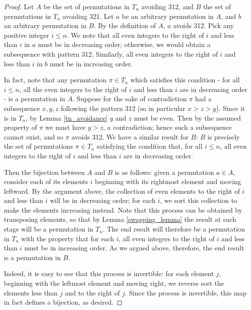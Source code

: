 \documentclass[11pt,letterpaper,twoside,english]{article}
\theoremstyle{theorem}
\theoremstyle{remark}
\begin{document}
\begin{proof}
Let $A$ be the set of permutations in $T_n$ avoiding 312, and $B$ the set of permutations in $T_n$ avoiding 321. Let $a$ be an arbitrary permutation in $A$, and $b$ an arbitrary permutation in $B$. By the definition of $A$, $a$ avoids 312. Pick any positive integer $i\leq n$. We note that all even integers to the right of $i$ and less than $i$ in $a$ must be in decreasing order; otherwise, we would obtain a subsequence with pattern 312. Similarly, all even integers to the right of $i$ and less than $i$ in $b$ must be in increasing order.

In fact, note that any permutation $\pi\in T_n$ which satisfies this condition - for all $i\leq n$, all the even integers to the right of $i$ and less than $i$ are in decreasing order - is a permutation in $A$. Suppose for the sake of contradiction $\pi$ had a subsequence $x, y, z$ following the pattern 312 (so in particular $x>z>y$). Since it is in $T_n$, by Lemma  \ref{tn_avoidance} $y$ and $z$ must be even. Then by the assumed property of $\pi$ we must have $y>z$, a contradiction; hence such a subsequence cannot exist, and so $\pi$ avoids 312. We have a similar result for $B$: $B$ is precisely the set of permutations $\pi\in T_n$ satisfying the condition that, for all $i\leq n$, all even integers to the right of $i$ and less than $i$ are in decreasing order.

Then the bijection between $A$ and $B$ is as follows: given a permutation $a\in A$, consider each of its elements $i$ beginning with its rightmost element and moving leftward. By the argument above, the collection of even elements to the right of $i$ and less than $i$ will be in decreasing order; for each $i$, we sort this collection to make the elements increasing instead. Note that this process can be obtained by transposing elements, so that by Lemma \ref{swapping_lemma} the result at each stage will be a permutation in $T_n$. The end result will therefore be a permutation in $T_n$ with the property that for each $i$, all even integers to the right of $i$ and less than $i$ must be in increasing order. As we argued above, therefore, the end result is a permutation in $B$.

Indeed, it is easy to see that this process is invertible: for each element $j$, beginning with the leftmost element and moving right, we reverse sort the elements less than $j$ and to the right of $j$. Since the process is invertible, this map in fact defines a bijection, as desired.
\end{proof}
\end{document}
